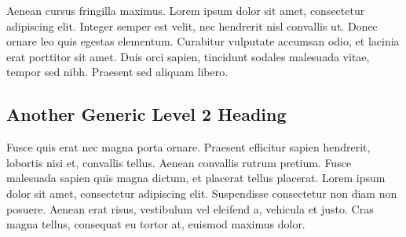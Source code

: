 

Aenean cursus fringilla maximus. Lorem ipsum dolor sit amet, consectetur adipiscing elit. Integer semper est velit, nec hendrerit nisl convallis ut. Donec ornare leo quis egestas elementum. Curabitur vulputate accumsan odio, et lacinia erat porttitor sit amet. Duis orci sapien, tincidunt sodales malesuada vitae, tempor sed nibh. Praesent sed aliquam libero.

\subsection{Another Generic Level 2 Heading}

Fusce quis erat nec magna porta ornare. Praesent efficitur sapien hendrerit, lobortis nisi et, convallis tellus. Aenean convallis rutrum pretium. Fusce malesuada sapien quis magna dictum, et placerat tellus placerat. Lorem ipsum dolor sit amet, consectetur adipiscing elit. Suspendisse consectetur non diam non posuere. Aenean erat risus, vestibulum vel eleifend a, vehicula et justo. Cras magna tellus, consequat eu tortor at, euismod maximus dolor.
